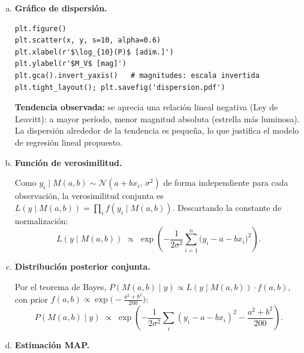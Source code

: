 \documentclass[a4paper,11pt]{article}
\theoremstyle{remark}
\begin{document}
\begin{enumerate}[a)]

\item \textbf{Gráfico de dispersión.}

\begin{lstlisting}
plt.figure()
plt.scatter(x, y, s=10, alpha=0.6)
plt.xlabel(r'$\log_{10}(P)$ [adim.]')
plt.ylabel(r'$M_V$ [mag]')
plt.gca().invert_yaxis()   # magnitudes: escala invertida
plt.tight_layout(); plt.savefig('dispersion.pdf')
\end{lstlisting}

\textbf{Tendencia observada:} se aprecia una relación lineal negativa
(Ley de Leavitt): a mayor período, menor magnitud absoluta (estrella más
luminosa). La dispersión alrededor de la tendencia es pequeña, lo que
justifica el modelo de regresión lineal propuesto.

\item \textbf{Función de verosimilitud.}

Como $y_i\mid M(a,b)\sim\mathcal{N}(a+bx_i,\,\sigma^2)$ de forma
independiente para cada observación, la verosimilitud conjunta es
$L(y\mid M(a,b))=\prod_i f(y_i\mid M(a,b))$. Descartando la constante
de normalización:
\begin{equation}
  L\!\left(y\mid M(a,b)\right)
  \;\propto\;
  \exp\!\left(-\frac{1}{2\sigma^2}\sum_{i=1}^{n}
              \bigl(y_i - a - bx_i\bigr)^2\right).
  \label{eq:vero}
\end{equation}

\item \textbf{Distribución posterior conjunta.}

Por el teorema de Bayes, $P(M(a,b)\mid y)\propto
L(y\mid M(a,b))\cdot f(a,b)$, con prior
$f(a,b)\propto\exp\!\bigl(-\tfrac{a^2+b^2}{200}\bigr)$:
\begin{equation}
  P\!\left(M(a,b)\mid y\right)
  \;\propto\;
  \exp\!\left(
    -\frac{1}{2\sigma^2}\sum_{i}(y_i-a-bx_i)^2
    -\frac{a^2+b^2}{200}
  \right).
  \label{eq:post}
\end{equation}

\item \textbf{Estimación MAP.}


\end{enumerate}
\end{document}
